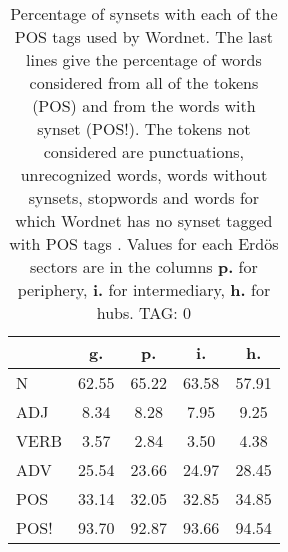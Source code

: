 \begin{table}[h!]
\begin{center}
\begin{tabular}{| l || c | c | c | c |}\hline
 & {\bf g.} & {\bf p.} & {\bf i.} & {\bf h.} \\\hline\hline
N & 62.55  & 65.22  & 63.58  & 57.91 \\\hline
ADJ & 8.34  & 8.28  & 7.95  & 9.25 \\\hline
VERB & 3.57  & 2.84  & 3.50  & 4.38 \\\hline
ADV & 25.54  & 23.66  & 24.97  & 28.45 \\\hline\hline
POS & 33.14  & 32.05  & 32.85  & 34.85 \\\hline
POS! & 93.70  & 92.87  & 93.66  & 94.54 \\\hline
\end{tabular}
\caption{Percentage of synsets with each of the POS tags used by Wordnet. The last lines give the percentage of words considered from all of the tokens (POS) and from the words with synset (POS!). The tokens not considered are punctuations, unrecognized words, words without synsets, stopwords and words for which Wordnet has no synset  tagged with POS tags . Values for each Erd\"os sectors are in the columns {{\bf p.}} for periphery, {{\bf i.}} for intermediary, {{\bf h.}} for hubs. TAG: 0}
\end{center}
\end{table}